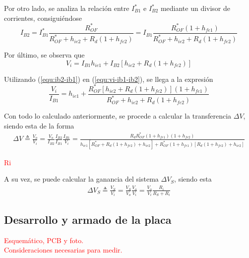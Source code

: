 Por otro lado, se analiza la relación entre $I_{B1}^*$ e $I_{B2}^*$ mediante un divisor de corrientes, consiguiéndose
\begin{equation}
	I_{B2} = I_{B1}^* \frac{R_{OF}^*}{R_{OF}^* + h_{ie2} + R_d \left( 1 + h_{fe2} \right)} = I_{B1} \frac{R_{OF}^* \left( 1 + h_{fe1} \right)}{R_{OF}^* + h_{ie2} + R_d \left( 1 + h_{fe2} \right)} 
\label{equ:ib2-ib1}
\end{equation}

Por último, se observa que
\begin{equation}
	V_i = I_{B1} h_{ie1} + I_{B2} \left[ h_{ie2} + R_d \left( 1 + h_{fe2} \right) \right]
\label{equ:vi-ib1-ib2}
\end{equation}

Utilizando (\ref{equ:ib2-ib1}) en (\ref{equ:vi-ib1-ib2}), se llega a la expresión
\begin{equation}
	\frac{V_i}{I_{B1}} =  h_{ie1} + \frac{ R_{OF}^* \left[ h_{ie2} + R_d \left( 1 + h_{fe2} \right) \right] \left( 1 + h_{fe1} \right)}{R_{OF}^* + h_{ie2} + R_d \left( 1 + h_{fe2} \right)}
\label{equ:vi-ib1}
\end{equation}

Con todo lo calculado anteriormente, se procede a calcular la transferencia $\Delta V$, siendo esta de la forma
\begin{equation}
\begin{split}
	\Delta V \triangleq \frac{V_o}{V_i} = \frac{V_o}{I_{B2}} \frac{I_{B2}}{I_{B1}} \frac{I_{B1}}{V_i} = \frac{R_d R_{OF}^* \left( 1 + h_{fe1} \right) \left( 1 + h_{fe2} \right)}{ h_{ie1} \left[ R_{OF}^* + R_d \left( 1 + h_{fe2} \right) + h_{ie2} \right] + R_{OF}^* \left( 1 + h_{fe1} \right) \left[ R_d \left( 1 + h_{fe2} \right) + h_{ie2} \right]}
\end{split}
\label{equ:v}
\end{equation}

\begin{center}
	\LARGE{\textcolor{red}{Ri}}
\end{center}

A su vez, se puede calcular la ganancia del sistema $\Delta V_S$, siendo esta
\begin{equation}
\begin{split}
	\Delta V_S \triangleq \frac{V_S}{V_i} = \frac{V_S}{V_o} \frac{V_o}{V_i} = \frac{V_o}{V_i} \frac{R_i}{R_S + R_i}
\end{split}
\label{equ:vs}
\end{equation}
 

\subsection{Desarrollo y armado de la placa}
\begin{center}
	\LARGE{\textcolor{red}{Esquemático, PCB y foto.}}\\
	\LARGE{\textcolor{red}{Consideraciones necesarias para medir.}}
\end{center}

